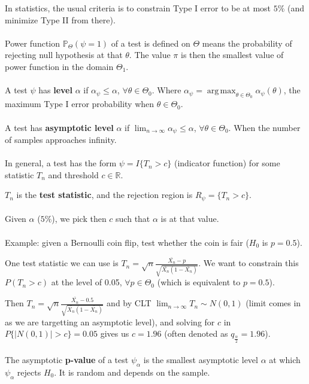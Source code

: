 \documentclass{article}
\DeclareMathOperator*{\argmax}{arg\,max}
\begin{document}
In statistics, the usual criteria is to constrain Type I error to be at most $5\%$ (and minimize Type II from there).
\\
\\
Power function $\mathbb{P}_{\Theta}(\psi = 1)$ of a test is defined on $\Theta$ means the probability of rejecting null hypothesis at that $\theta$.
The value $\pi$ is then the smallest value of power function in the domain $\Theta_1$.
\\
\\
A test $\psi$ has \textbf{level} $\alpha$ if $\alpha_{\psi} \leq \alpha$, $\forall \theta \in \Theta_0$.
Where $\alpha_{\psi} = \argmax_{\theta \in \Theta_0} \alpha_{\psi}(\theta)$, the maximum Type I error probability when $\theta \in \Theta_0$.
\\
\\
A test has \textbf{asymptotic level} $\alpha$ if $\lim_{n \to \infty} \alpha_{\psi} \leq \alpha$, $\forall \theta \in \Theta_0$.
When the number of samples approaches infinity.
\\
\\
In general, a test has the form $\psi = I\{T_n > c\}$ (indicator function) for some statistic $T_n$ and threshold $c \in \mathbb{R}$.

$T_n$ is the \textbf{test statistic}, and the rejection region is $R_{\psi} = \{T_n > c\}$.
\\
\\
Given $\alpha$ ($5\%$), we pick then $c$ such that $\alpha$ is at that value.
\\
\\
Example: given a Bernoulli coin flip, test whether the coin is fair ($H_0$ is $p = 0.5$).

One test statistic we can use is $T_n = \sqrt{n} \frac{\bar{X_n} - p}{\sqrt{\bar{X_n} (1 - \bar{X_n})}}$. We want to constrain this $P(T_n > c)$ at the level of 0.05, $\forall p \in \Theta_0$ (which is equivalent to $p = 0.5$).

Then $T_n = \sqrt{n} \frac{\bar{X_n} - 0.5}{\sqrt{\bar{X_n} (1 - \bar{X_n})}}$ and by CLT $\lim_{n \to \infty} T_n \sim N(0, 1)$ (limit comes in as we are targetting an asymptotic level), and solving for $c$ in $P\{|N(0, 1)| > c\} = 0.05$ gives us $c = 1.96$ (often denoted as $q_{\frac{\alpha}{2}} = 1.96$).
\\
\\
The asymptotic \textbf{p-value} of a test $\psi_{\alpha}$ is the smallest asymptotic level $\alpha$ at which $\psi_{\alpha}$ rejects $H_0$.
It is random and depends on the sample.
\end{document}
